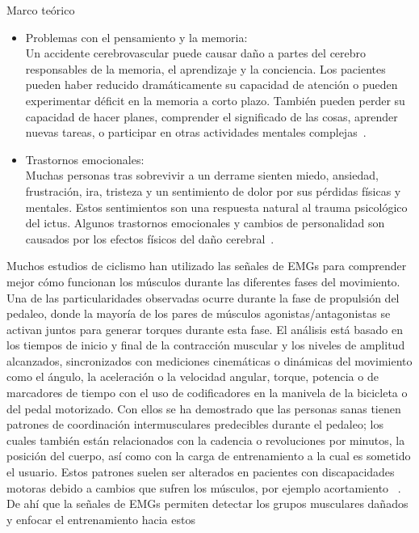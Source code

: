 \begin{thesischapter}{1} {Marco teórico}
\begin{itemize}
\begin{itemize}
            \item afasia global , en la que las personas pierden casi todas sus habilidades lingüísticas; no pueden entender el lenguaje o usarlo para transmitir pensamientos.  
        \end{itemize}
        \item Problemas con el pensamiento y la memoria:\\
        Un accidente cerebrovascular puede causar daño a partes del cerebro responsables de la memoria, el aprendizaje y la conciencia. Los pacientes pueden haber reducido dramáticamente su capacidad de atención o pueden experimentar déficit en la memoria a corto plazo. También pueden perder su capacidad de hacer planes, comprender el significado de las cosas, aprender nuevas tareas, o participar en otras actividades mentales complejas~\cite{post-strok}.
        \item Trastornos emocionales:\\
        Muchas personas tras sobrevivir a un derrame sienten miedo, ansiedad, frustración, ira, tristeza y un sentimiento de dolor por sus pérdidas físicas y mentales. Estos sentimientos son una respuesta natural al trauma psicológico del ictus. Algunos trastornos emocionales y cambios de personalidad son causados por los efectos físicos del daño cerebral~\cite{post-strok}. 
    \end{itemize}

    \vspace{10pt}
    Muchos estudios de ciclismo han utilizado las señales de EMGs para comprender mejor cómo funcionan los músculos durante las diferentes fases del movimiento. Una de las particularidades observadas ocurre durante la fase de propulsión del pedaleo, donde la mayoría de los pares de músculos agonistas/antagonistas se activan juntos para generar torques durante esta fase. El análisis está basado en los tiempos de inicio y final de la contracción muscular y los niveles de amplitud alcanzados, sincronizados con mediciones cinemáticas o dinámicas del movimiento como el ángulo, la aceleración o la velocidad angular, torque, potencia o de marcadores de tiempo con el uso de codificadores en la manivela de la bicicleta o del pedal motorizado. Con ellos se ha demostrado que las personas sanas tienen patrones de coordinación intermusculares predecibles durante el pedaleo; los cuales también están relacionados con la cadencia o revoluciones por minutos, la posición del cuerpo, así como con la carga de entrenamiento a la cual es sometido el usuario. Estos patrones suelen ser alterados en pacientes con discapacidades motoras debido a cambios que sufren los músculos, por ejemplo acortamiento ~\cite{johnston2007biomechanical}. De ahí que la señales de EMGs permiten detectar los grupos musculares dañados y enfocar el entrenamiento hacia estos ~\cite{hug2009electromyographic, kautz1998relationships}


\end{thesischapter}
